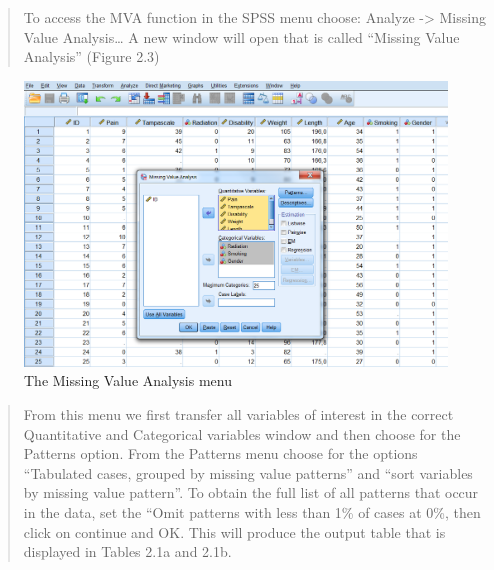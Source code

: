\documentclass[]{book}
\begin{document}
\begin{quote}
To access the MVA function in the SPSS menu choose: Analyze
-\textgreater{} Missing Value Analysis\ldots{} A new window will open
that is called ``Missing Value Analysis'' (Figure 2.3)
\end{quote}

\begin{figure}

{\centering \includegraphics[width=0.9\linewidth]{images/fig2.3} 

}

\caption{The Missing Value Analysis menu}\label{fig:fig29}
\end{figure}

\begin{quote}
From this menu we first transfer all variables of interest in the
correct Quantitative and Categorical variables window and then choose
for the Patterns option. From the Patterns menu choose for the options
``Tabulated cases, grouped by missing value patterns'' and ``sort
variables by missing value pattern''. To obtain the full list of all
patterns that occur in the data, set the ``Omit patterns with less than
1\% of cases at 0\%, then click on continue and OK. This will produce
the output table that is displayed in Tables 2.1a and 2.1b.
\end{quote}
\end{document}
